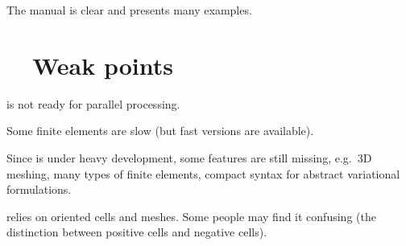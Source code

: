 The manual is clear and presents many examples.


\section{~~Weak points}\label{\numb section 1.\numb parag 10}

{\ManiFEM} is not ready for parallel processing.

Some finite elements are slow (but fast versions are available).

Since {\maniFEM} is under heavy development, some features are still missing,
e.g.\ 3D meshing, many types of finite elements, compact syntax for abstract variational
formulations.

{\ManiFEM} relies on oriented cells and meshes.
Some people may find it confusing (the distinction between positive cells and negative cells).
